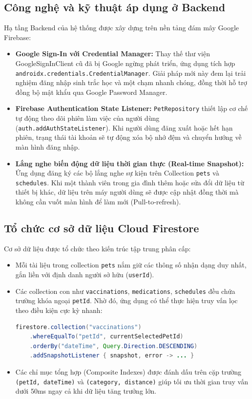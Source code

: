 \subsection{Công nghệ và kỹ thuật áp dụng ở Backend}
\label{subsec:cong_nghe_backend}

Hạ tầng Backend của hệ thống được xây dựng trên nền tảng đám mây Google Firebase:
\begin{itemize}
    \item \textbf{Google Sign-In với Credential Manager:} Thay thế thư viện GoogleSignInClient cũ đã bị Google ngừng phát triển, ứng dụng tích hợp \texttt{androidx.credentials.CredentialManager}. Giải pháp mới này đem lại trải nghiệm đăng nhập sinh trắc học và một chạm nhanh chóng, đồng thời hỗ trợ đồng bộ mật khẩu qua Google Password Manager.
    \item \textbf{Firebase Authentication State Listener:} \texttt{PetRepository} thiết lập cơ chế tự động theo dõi phiên làm việc của người dùng (\texttt{auth.addAuthStateListener}). Khi người dùng đăng xuất hoặc hết hạn phiên, trạng thái tài khoản sẽ tự động xóa bộ nhớ đệm và chuyển hướng về màn hình đăng nhập.
    \item \textbf{Lắng nghe biến động dữ liệu thời gian thực (Real-time Snapshot):} Ứng dụng đăng ký các bộ lắng nghe sự kiện trên Collection \texttt{pets} và \texttt{schedules}. Khi một thành viên trong gia đình thêm hoặc sửa đổi dữ liệu từ thiết bị khác, dữ liệu trên máy người dùng sẽ được cập nhật đồng thời mà không cần vuốt màn hình để làm mới (Pull-to-refresh).
\end{itemize}

\subsection{Tổ chức cơ sở dữ liệu Cloud Firestore}
\label{subsec:csdl_su_dung}

Cơ sở dữ liệu được tổ chức theo kiến trúc tập trung phân cấp:
\begin{itemize}
    \item Mỗi tài liệu trong collection \texttt{pets} nắm giữ các thông số nhận dạng duy nhất, gắn liền với định danh người sở hữu (\texttt{userId}).
    \item Các collection con như \texttt{vaccinations}, \texttt{medications}, \texttt{schedules} đều chứa trường khóa ngoại \texttt{petId}. Nhờ đó, ứng dụng có thể thực hiện truy vấn lọc theo điều kiện cực kỳ nhanh:
    \begin{lstlisting}[language=Java, caption={Đoạn truy vấn lọc dữ liệu theo petId trong Firestore}, label={lst:firestore_query}]
firestore.collection("vaccinations")
    .whereEqualTo("petId", currentSelectedPetId)
    .orderBy("dateTime", Query.Direction.DESCENDING)
    .addSnapshotListener { snapshot, error -> ... }
    \end{lstlisting}
    \item Các chỉ mục tổng hợp (Composite Indexes) được đánh dấu trên cặp trường \texttt{(petId, dateTime)} và \texttt{(category, distance)} giúp tối ưu thời gian truy vấn dưới 50ms ngay cả khi dữ liệu tăng trưởng lớn.
\end{itemize}


